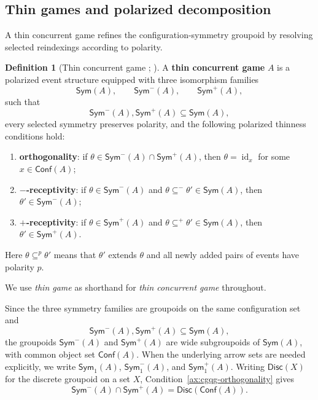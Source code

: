 \documentclass[oneside]{article}
\newcommand{\Conf}{\mathsf{Conf}}
\newcommand{\Sym}{\mathsf{Sym}}
\newcommand{\Disc}{\mathsf{Disc}}
\newcommand{\id}{\operatorname{id}}
\theoremstyle{plain}
\theoremstyle{definition}
\newtheorem{definition}[theorem]{Definition}
\theoremstyle{remark}
\begin{document}
\subsection{Thin games and polarized decomposition}

A thin concurrent game refines the configuration-symmetry groupoid by resolving selected reindexings according to polarity.

\begin{definition}[Thin concurrent game {\cite[Def.~3.16]{CastellanClairambaultWinskel2019}; \cite[Def.~5.2]{ClairambaultOlimpieriPaquet2025}}]
\label{def:cgqg-thin-game-background}
    A \textbf{thin concurrent game} \(A\) is a polarized event structure equipped with three isomorphism families
    \[
        \Sym(A),\qquad \Sym^-(A),\qquad \Sym^+(A),
    \]
    such that
    \[
        \Sym^-(A),\Sym^+(A)\subseteq\Sym(A),
    \]
    every selected symmetry preserves polarity, and the following polarized thinness conditions hold:
    \begin{enumerate}[label=\textup{(\roman*)}]
        \item\label{ax:cgqg-orthogonality} \textbf{orthogonality}: if \(\theta\in\Sym^-(A)\cap\Sym^+(A)\), then \(\theta=\id_x\) for some \(x\in\Conf(A)\);

        \item \textbf{\(-\)-receptivity}: if \(\theta\in\Sym^-(A)\) and \(\theta\subseteq^-\theta'\in\Sym(A)\), then \(\theta'\in\Sym^-(A)\);

        \item \textbf{\(+\)-receptivity}: if \(\theta\in\Sym^+(A)\) and \(\theta\subseteq^+\theta'\in\Sym(A)\), then \(\theta'\in\Sym^+(A)\).
    \end{enumerate}
    Here \(\theta\subseteq^p\theta'\) means that \(\theta'\) extends \(\theta\) and all newly added pairs of events have polarity \(p\).
\end{definition}

We use \emph{thin game} as shorthand for \emph{thin concurrent game} throughout.

Since the three symmetry families are groupoids on the same configuration set and
\[
    \Sym^-(A),\Sym^+(A)\subseteq\Sym(A),
\]
the groupoids \(\Sym^-(A)\) and \(\Sym^+(A)\) are wide subgroupoids of \(\Sym(A)\), with common object set \(\Conf(A)\). When the underlying arrow sets are needed explicitly, we write \(\Sym_1(A)\), \(\Sym^-_1(A)\), and \(\Sym^+_1(A)\). Writing \(\Disc(X)\) for the discrete groupoid on a set \(X\), Condition~\ref{ax:cgqg-orthogonality} gives
\begin{equation}
    \Sym^-(A)\cap \Sym^+(A)=\Disc(\Conf(A)).
\label{eq:cgqg-polarized-trivial-intersection}
\end{equation}
\end{document}
